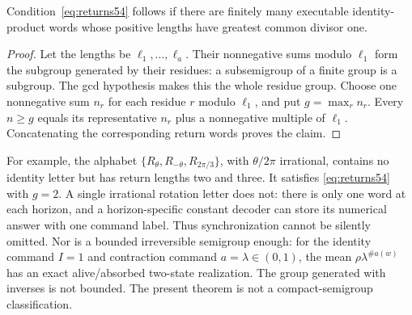 \begin{proposition}\label{prop:return54}
Condition~\eqref{eq:returns54} follows if there are finitely many executable identity-product words whose positive lengths have greatest common divisor one.
\end{proposition}
\begin{proof}
Let the lengths be $\ell_1,\ldots,\ell_a$. Their nonnegative sums modulo $\ell_1$ form the subgroup generated by their residues: a subsemigroup of a finite group is a subgroup. The gcd hypothesis makes this the whole residue group. Choose one nonnegative sum $n_r$ for each residue $r$ modulo $\ell_1$, and put $g=\max_r n_r$. Every $n\ge g$ equals its representative $n_r$ plus a nonnegative multiple of $\ell_1$. Concatenating the corresponding return words proves the claim.
\end{proof}
For example, the alphabet $\{R_\theta,R_{-\theta},R_{2\pi/3}\}$, with $\theta/2\pi$ irrational, contains no identity letter but has return lengths two and three. It satisfies \eqref{eq:returns54} with $g=2$. A single irrational rotation letter does not: there is only one word at each horizon, and a horizon-specific constant decoder can store its numerical answer with one command label. Thus synchronization cannot be silently omitted. Nor is a bounded irreversible semigroup enough: for the identity command $I=1$ and contraction command $a=\lambda\in(0,1)$, the mean $\rho\lambda^{\#a(w)}$ has an exact alive/absorbed two-state realization. The group generated with inverses is not bounded. The present theorem is not a compact-semigroup classification.
